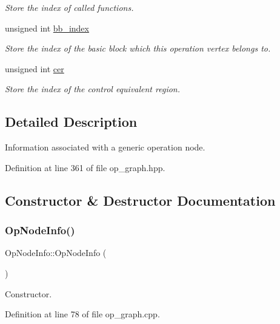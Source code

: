 \begin{DoxyCompactItemize}
\begin{DoxyCompactList}\small\item\em Store the index of called functions. \end{DoxyCompactList}\item 
unsigned int \hyperlink{structOpNodeInfo_adf1ca07b35dbffaafe72c5b4a209d9ee}{bb\+\_\+index}
\begin{DoxyCompactList}\small\item\em Store the index of the basic block which this operation vertex belongs to. \end{DoxyCompactList}\item 
unsigned int \hyperlink{structOpNodeInfo_ad609377fed2c03245d26ebfd8117371d}{cer}
\begin{DoxyCompactList}\small\item\em Store the index of the control equivalent region. \end{DoxyCompactList}\end{DoxyCompactItemize}


\subsection{Detailed Description}
Information associated with a generic operation node. 

Definition at line 361 of file op\+\_\+graph.\+hpp.



\subsection{Constructor \& Destructor Documentation}
\mbox{\label{structOpNodeInfo_a756bde8314600d48ef576baea924d165}} 
\subsubsection{\texorpdfstring{Op\+Node\+Info()}{OpNodeInfo()}}
{\footnotesize\ttfamily Op\+Node\+Info\+::\+Op\+Node\+Info (\begin{DoxyParamCaption}{ }\end{DoxyParamCaption})}



Constructor. 



Definition at line 78 of file op\+\_\+graph.\+cpp.



